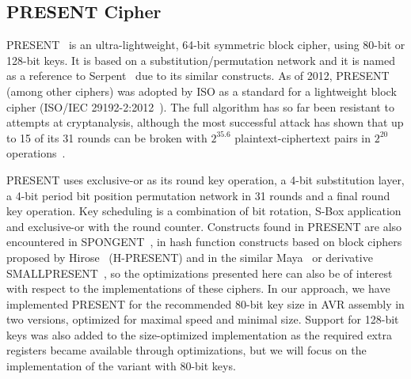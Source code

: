 \documentclass[11pt]{llncs2e} %
\begin{document}
\subsection{PRESENT Cipher}
 PRESENT~\cite{bogdanov2007present} is an ultra-lightweight, 64-bit symmetric block cipher, using 80-bit or 128-bit keys.
It is based on a substitution/permutation network and it is named as a reference to Serpent~\cite{anderson1998serpent} due to its similar constructs.
As of 2012, PRESENT (among other ciphers) was adopted by ISO as a standard for a lightweight block cipher (ISO/IEC 29192-2:2012~\cite{present_iso}). The full algorithm has so far been resistant to attempts at cryptanalysis, although the most successful attack has shown that up to 15 of its 31 rounds can be broken with $2^{35.6}$ plaintext-ciphertext pairs in $2^{20}$ operations~\cite{abed2012biclique,collard2009statistical,nakahara2009linear}.

PRESENT uses exclusive-or as its round key operation, a 4-bit substitution layer, a 4-bit period bit position permutation network in 31 rounds and a final round key operation.
Key scheduling is a combination of bit rotation, S-Box application and exclusive-or with the round counter.
Constructs found in PRESENT are also encountered in SPONGENT~\cite{bogdanov2011spongent}, in hash function constructs based on block ciphers proposed by Hirose~\cite{bogdanov2008hash,hirose2005provably,hirose2006some} (H-PRESENT) and in the similar Maya~\cite{gomathisankaran2009maya} or derivative SMALLPRESENT~\cite{leander2010small}, so the optimizations presented here can also be of interest with respect to the implementations of these ciphers. In our approach, we have implemented PRESENT for the recommended 80-bit key size in AVR assembly in two versions, optimized for maximal speed and minimal size.
Support for 128-bit keys was also added to the size-optimized implementation as the required extra registers became available through optimizations, but we will focus on the implementation of the variant with 80-bit keys.
\end{document}
